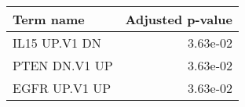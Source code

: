 \begin{tabular}{lr}
\toprule
    Term name &  Adjusted p-value \\
\midrule
IL15 UP.V1 DN &          3.63e-02 \\
PTEN DN.V1 UP &          3.63e-02 \\
EGFR UP.V1 UP &          3.63e-02 \\
\bottomrule
\end{tabular}

